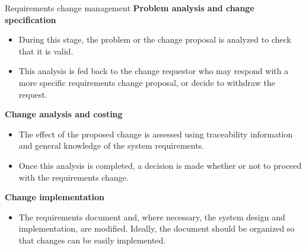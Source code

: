 \documentclass{beamer}
\begin{document}
\begin{frame}{Requirements change management}
	\textbf{Problem analysis and change specification}
\begin{itemize}
	\item During this stage, the problem or the change proposal is analyzed to check that it is valid. 
	\item This analysis is fed back to the change requestor who may respond with a more specific 
	requirements change proposal, or decide to withdraw the request.
\end{itemize}
\textbf{Change analysis and costing}
\begin{itemize}
	\item The effect of the proposed change is assessed using traceability information and general 
	knowledge of the system requirements.
	\item  Once this analysis is completed, a decision is 
	made whether or not to proceed with the requirements change.

\end{itemize}
\textbf{Change implementation}
\begin{itemize}
	\item The requirements document and, where necessary, the system design and 
	implementation, are modified. Ideally, the document should be organized so that 
	changes can be easily implemented.
	
\end{itemize}
\end{frame}
\end{document}
